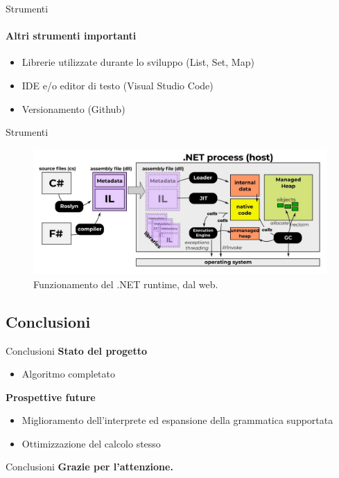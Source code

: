 \documentclass{beamer}
\begin{document}
\begin{darkframes}
    \begin{frame}{Strumenti}
        \framesubtitle{Altri strumenti importanti}
        \begin{itemize}
            \item Librerie utilizzate durante lo sviluppo (List, Set, Map)
            \item IDE e/o editor di testo (Visual Studio Code)
            \item Versionamento (Github)
        \end{itemize}
    \end{frame}

    \begin{frame}{Strumenti}
        \begin{figure}[h]
            \caption{Funzionamento del .NET runtime, dal web.}
            \includegraphics[width=\textwidth]{../images/dotnet.png}
        \end{figure}
    \end{frame}

    \subsection{Conclusioni}
    \begin{frame}{Conclusioni}
        \textbf{Stato del progetto}
        \begin{itemize}
            \item Algoritmo completato
        \end{itemize}
        \textbf{Prospettive future}
        \begin{itemize}
            \item Miglioramento dell'interprete ed espansione della grammatica supportata
            \item Ottimizzazione del calcolo stesso
        \end{itemize}
    \end{frame}

    \begin{frame}{Conclusioni}
        \textbf{Grazie per l'attenzione.}
    \end{frame}

\end{darkframes}
\end{document}
